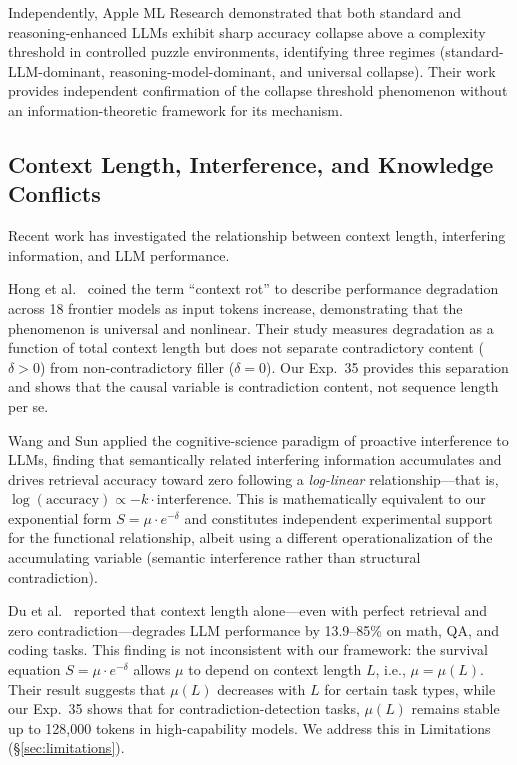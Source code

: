 \documentclass[11pt,a4paper]{article}
\begin{document}
Independently, Apple ML Research \citep{apple2025illusion} demonstrated that both standard and reasoning-enhanced LLMs exhibit sharp accuracy collapse above a complexity threshold in controlled puzzle environments, identifying three regimes (standard-LLM-dominant, reasoning-model-dominant, and universal collapse). Their work provides independent confirmation of the collapse threshold phenomenon without an information-theoretic framework for its mechanism.

\subsection{Context Length, Interference, and Knowledge Conflicts}

Recent work has investigated the relationship between context length, interfering information, and LLM performance.

Hong et al.\ \citep{hong2025contextrot} coined the term ``context rot'' to describe performance degradation across 18 frontier models as input tokens increase, demonstrating that the phenomenon is universal and nonlinear. Their study measures degradation as a function of total context length but does not separate contradictory content ($\delta > 0$) from non-contradictory filler ($\delta = 0$). Our Exp.~35 provides this separation and shows that the causal variable is contradiction content, not sequence length per se.

Wang and Sun \citep{wang2025interference} applied the cognitive-science paradigm of proactive interference to LLMs, finding that semantically related interfering information accumulates and drives retrieval accuracy toward zero following a \emph{log-linear} relationship---that is, $\log(\text{accuracy}) \propto -k \cdot \text{interference}$. This is mathematically equivalent to our exponential form $S = \mu \cdot e^{-\delta}$ and constitutes independent experimental support for the functional relationship, albeit using a different operationalization of the accumulating variable (semantic interference rather than structural contradiction).

Du et al.\ \citep{du2025contextlength} reported that context length alone---even with perfect retrieval and zero contradiction---degrades LLM performance by 13.9--85\% on math, QA, and coding tasks. This finding is not inconsistent with our framework: the survival equation $S = \mu \cdot e^{-\delta}$ allows $\mu$ to depend on context length $L$, i.e., $\mu = \mu(L)$. Their result suggests that $\mu(L)$ decreases with $L$ for certain task types, while our Exp.~35 shows that for contradiction-detection tasks, $\mu(L)$ remains stable up to 128{,}000 tokens in high-capability models. We address this in Limitations (\S\ref{sec:limitations}).
\end{document}
